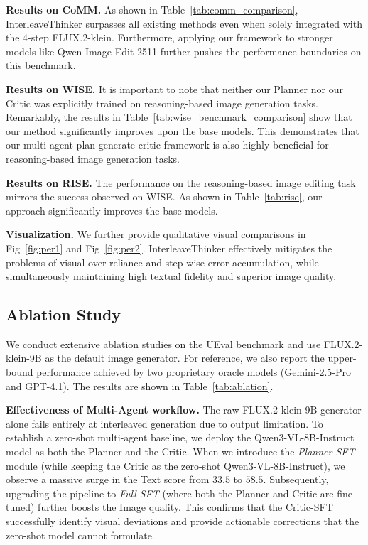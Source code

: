 \documentclass{article} %
\begin{document}
\textbf{Results on CoMM.} As shown in Table~\ref{tab:comm_comparison}, InterleaveThinker surpasses all existing methods even when solely integrated with the 4-step FLUX.2-klein. Furthermore, applying our framework to stronger models like Qwen-Image-Edit-2511 further pushes the performance boundaries on this benchmark.

\textbf{Results on WISE.} It is important to note that neither our Planner nor our Critic was explicitly trained on reasoning-based image generation tasks. Remarkably, the results in Table~\ref{tab:wise_benchmark_comparison} show that our method significantly improves upon the base models. 
This demonstrates that our multi-agent plan-generate-critic framework is also highly beneficial for reasoning-based image generation tasks.

\textbf{Results on RISE.} The performance on the reasoning-based image editing task mirrors the success observed on WISE. 
As shown in Table~\ref{tab:rise}, our approach significantly improves the base models.

\textbf{Visualization.} We further provide qualitative visual comparisons in Fig~\ref{fig:per1} and Fig~\ref{fig:per2}. 
InterleaveThinker effectively mitigates the problems of visual over-reliance and step-wise error accumulation, while simultaneously maintaining high textual fidelity and superior image quality.


\subsection{Ablation Study}
\label{subsec:ablation}

We conduct extensive ablation studies on the UEval benchmark and use FLUX.2-klein-9B as the default image generator. For reference, we also report the upper-bound performance achieved by two proprietary oracle models (Gemini-2.5-Pro and GPT-4.1). The results are shown in Table~\ref{tab:ablation}.

\textbf{Effectiveness of Multi-Agent workflow.} 
The raw FLUX.2-klein-9B generator alone fails entirely at interleaved generation due to output limitation. 
To establish a zero-shot multi-agent baseline, we deploy the Qwen3-VL-8B-Instruct model as both the Planner and the Critic. When we introduce the \textit{Planner-SFT} module (while keeping the Critic as the zero-shot Qwen3-VL-8B-Instruct), we observe a massive surge in the Text score from $33.5$ to $58.5$. 
Subsequently, upgrading the pipeline to \textit{Full-SFT} (where both the Planner and Critic are fine-tuned) further boosts the Image quality. This confirms that the Critic-SFT successfully identify visual deviations and provide actionable corrections that the zero-shot model cannot formulate.
\end{document}
